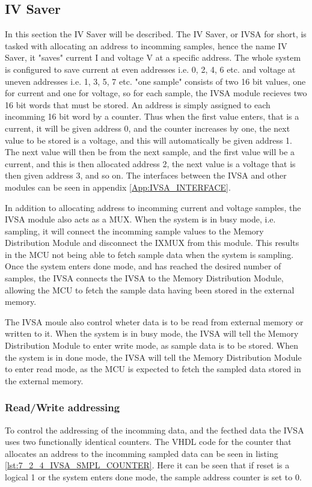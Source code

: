 \subsection{IV Saver} \label{subsec:IVSA}
In this section the IV Saver will be described. The IV Saver, or IVSA for short, is tasked with allocating an address to incomming samples, hence the name IV Saver, it "saves" current I and voltage V at a specific address. The whole system is configured to save current at even addresses i.e. 0, 2, 4, 6 etc. and voltage at uneven addresses i.e. 1, 3, 5, 7 etc. "one sample" consists of two 16 bit values, one for current and one for voltage, so for each sample, the IVSA module recieves two 16 bit words that must be stored. An address is simply assigned to each incomming 16 bit word by a counter. Thus when the first value enters, that is a current, it will be given address 0, and the counter increases by one, the next value to be stored is a voltage, and this will automatically be given address 1. The next value will then be from the next sample, and the first value will be a current, and this is then allocated address 2, the next value is a voltage that is then given address 3, and so on. The interfaces between the IVSA and other modules can be seen in appendix \ref{App:IVSA_INTERFACE}.

In addition to allocating address to incomming current and voltage samples, the IVSA module also acts as a MUX. When the system is in busy mode, i.e. sampling, it will connect the incomming sample values to the Memory Distribution Module and disconnect the IXMUX from this module. This results in the MCU not being able to fetch sample data when the system is sampling. Once the system enters done mode, and has reached the desired number of samples, the IVSA connects the IVSA to the Memory Distribution Module, allowing the MCU to fetch the sample data having been stored in the external memory. 

The IVSA moule also control wheter data is to be read from external memory or written to it. When the system is in busy mode, the IVSA will tell the Memory Distribution Module to enter write mode, as sample data is to be stored. When the system is in done mode, the IVSA will tell the Memory Distribution Module to enter read mode, as the MCU is expected to fetch the sampled data stored in the external memory.

\subsubsection{Read/Write addressing}
To control the addressing of the incomming data, and the fecthed data the IVSA uses two functionally identical counters. The VHDL code for the counter that allocates an address to the incomming sampled data can be seen in listing \ref{lst:7_2_4_IVSA_SMPL_COUNTER}. Here it can be seen that if reset is a logical 1 or the system enters done mode, the sample address counter is set to 0.

